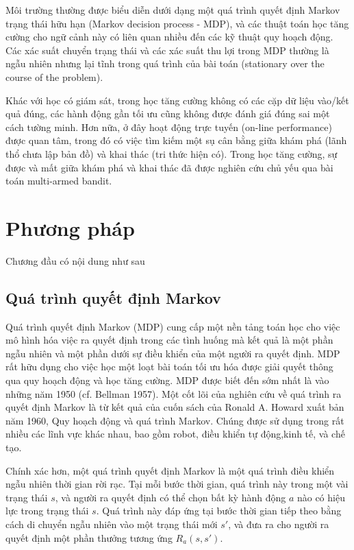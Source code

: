 \documentclass[14pt,a4paper,oneside]{report}		%
\begin{document}
Môi trường thường được biểu diễn dưới dạng một quá trình quyết định Markov trạng thái hữu hạn (Markov decision process - MDP), và các thuật toán học tăng cường cho ngữ cảnh này có liên quan nhiều đến các kỹ thuật quy hoạch động. Các xác suất chuyển trạng thái và các xác suất thu lợi trong MDP thường là ngẫu nhiên nhưng lại tĩnh trong quá trình của bài toán (stationary over the course of the problem).

Khác với học có giám sát, trong học tăng cường không có các cặp dữ liệu vào/kết quả đúng, các hành động gần tối ưu cũng không được đánh giá đúng sai một cách tường minh. Hơn nữa, ở đây hoạt động trực tuyến (on-line performance) được quan tâm, trong đó có việc tìm kiếm một sụ cân bằng giữa khám phá (lãnh thổ chưa lập bản đồ) và khai thác (tri thức hiện có). Trong học tăng cường, sự được và mất giữa khám phá và khai thác đã được nghiên cứu chủ yếu qua bài toán multi-armed bandit.
\chapter{Phương pháp}
Chương đầu có nội dung như sau

\section{Quá trình quyết định Markov}
Quá trình quyết định Markov (MDP) cung cấp một nền tảng toán học cho việc mô hình hóa việc ra quyết định trong các tình huống mà kết quả là một phần ngẫu nhiên và một phần dưới sự điều khiển của một người ra quyết định. MDP rất hữu dụng cho việc học một loạt bài toán tối ưu hóa được giải quyết thông qua quy hoạch động và học tăng cường. MDP được biết đến sớm nhất là vào những năm 1950 (cf. Bellman 1957). Một cốt lõi của nghiên cứu về quá trình ra quyết định Markov là từ kết quả của cuốn sách của Ronald A. Howard xuất bản năm 1960, Quy hoạch động và quá trình Markov. Chúng được sử dụng trong rất nhiều các lĩnh vực khác nhau, bao gồm robot, điều khiển tự động,kinh tế, và chế tạo.

Chính xác hơn, một quá trình quyết định Markov là một quá trình điều khiển ngẫu nhiên thời gian rời rạc. Tại mỗi bước thời gian, quá trình này trong một vài trạng thái $s$, và người ra quyết định có thể chọn bất kỳ hành động $a$ nào có hiệu lực trong trạng thái $s$. Quá trình này đáp ứng tại bước thời gian tiếp theo bằng cách di chuyển ngẫu nhiên vào một trạng thái mới $s'$, và đưa ra cho người ra quyết định một phần thưởng tương ứng $R_a(s,s')$.
\end{document}
